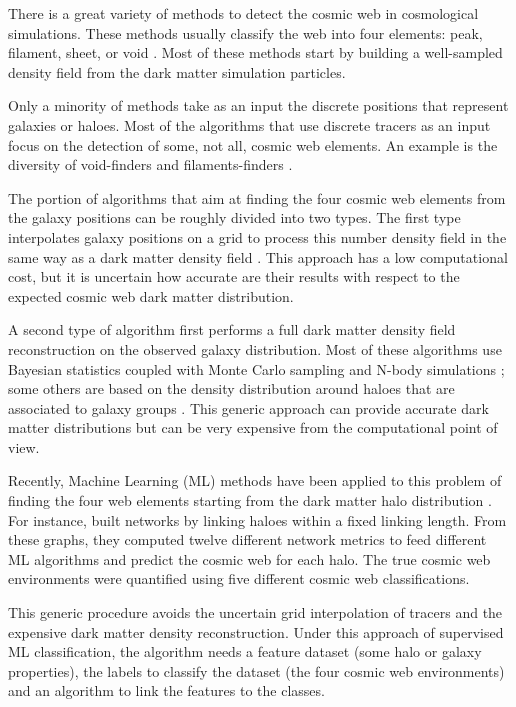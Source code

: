 \documentclass[usenatbib]{mnras}
\begin{document}
There is a great variety of methods to detect
the cosmic web in cosmological simulations.
These methods usually classify the web into four
elements: peak, filament, sheet, or void \citep{Libeskind2018}.
Most of these methods start by building a well-sampled density field from the dark matter simulation particles.

Only a minority of methods take as an input the discrete positions that
represent galaxies or haloes.
Most of the algorithms that use discrete tracers as an input focus on the detection of some, not all, cosmic web elements.
An example is the diversity of void-finders
\citep{Platen2007,Neyrinck2008} and filaments-finders
\citep{Novikov2003,Zhang2009,Sousbie2010,Chen2015,Luber2019}.   

The portion of algorithms that aim at finding the four cosmic web elements from the galaxy positions can be roughly divided into two types.
The first type interpolates galaxy positions on a grid to process this number density field in the same way as a dark matter density field \citep{Eardley2015,Alpaslan2016,Tojeiro2017,Shadab2019}.
This approach has a low computational cost, but it is uncertain 
how accurate are their results with respect to the expected cosmic web dark matter distribution.

A second type of algorithm first performs a full dark matter density field reconstruction on the observed galaxy distribution.
Most of these algorithms use Bayesian statistics coupled with Monte
Carlo sampling and N-body
simulations \citep{Jasche2010,Jasche2013a,Bos2014,LeclercqJasche2015,Horowitz2019,Burchett2020};
some others are based on the density distribution around haloes that are associated to galaxy groups \citep{Wang2009,Munoz-Cuartas2011}.
This generic approach can provide accurate dark matter distributions but can
be very expensive from the computational point of view.

Recently, Machine Learning (ML) methods 
have been applied to this problem of finding the four web elements
starting from the dark matter halo distribution \citep{Hui2018, Tsizh2019}.
For instance, 
\citep{Tsizh2019} built networks by linking haloes within a fixed linking length. 
From these graphs, they computed twelve different network metrics  to feed different ML algorithms and predict the cosmic web for each halo. The true cosmic web environments were quantified using five different cosmic web classifications.

This generic procedure avoids the uncertain grid interpolation of
tracers and the expensive dark matter density reconstruction. 
Under this approach of supervised ML classification, 
the algorithm needs a feature dataset (some halo or galaxy
properties), the labels to classify the dataset (the four cosmic web
environments) and an algorithm to link the features to the classes.
\end{document}

